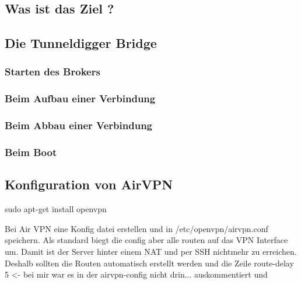 \subsection{Was ist das Ziel ?}




\subsection{Die Tunneldigger Bridge}

\subsubsection{Starten des Brokers}
 
\subsubsection{Beim Aufbau einer Verbindung}

\subsubsection{Beim Abbau einer Verbindung}

\subsubsection{Beim Boot}


\subsection{Konfiguration von AirVPN}

sudo apt-get install openvpn

Bei Air VPN eine Konfig datei erstellen und  in /etc/openvpn/airvpn.conf speichern.
Als standard biegt die config aber alle routen auf das VPN Interface um. Damit ist der Server hinter einem NAT und per SSH nichtmehr zu erreichen. 
Deshalb sollten die Routen automatisch erstellt werden und die Zeile
route-delay 5 <- bei mir war es in der airvpn-config nicht drin...
auskommentiert und

